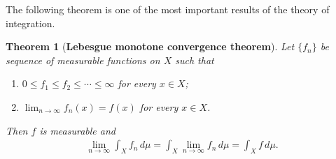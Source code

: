 \documentclass[11pt]{book}
\newtheorem{theorem}{Theorem}[chapter]
\theoremstyle{definition}
\numberwithin{equation}{chapter}
\begin{document}
\medskip

The following theorem is one of the most important results of the theory of integration.

\medskip

\begin{theorem}[{\bf Lebesgue monotone convergence theorem}]\label{theorem_29}
Let $\{f_n\}$ be sequence of measurable functions on $X$ such that
\begin{enumerate}[label=(\alph*)]
    \item $0 \leq f_1 \leq f_2 \leq \cdots \leq \infty$ for every $x \in X$;
    
    \item $\lim_{n\to\infty} f_n(x) = f(x)$ for every $x \in X$.
\end{enumerate}
Then $f$ is measurable and 
\begin{align*}
    \lim_{n\to\infty} \int_X f_n\,d\mu = \int_X \lim_{n\to\infty}  f_n\,d\mu = \int_X f\,d\mu.
\end{align*}
\end{theorem}
\end{document}
